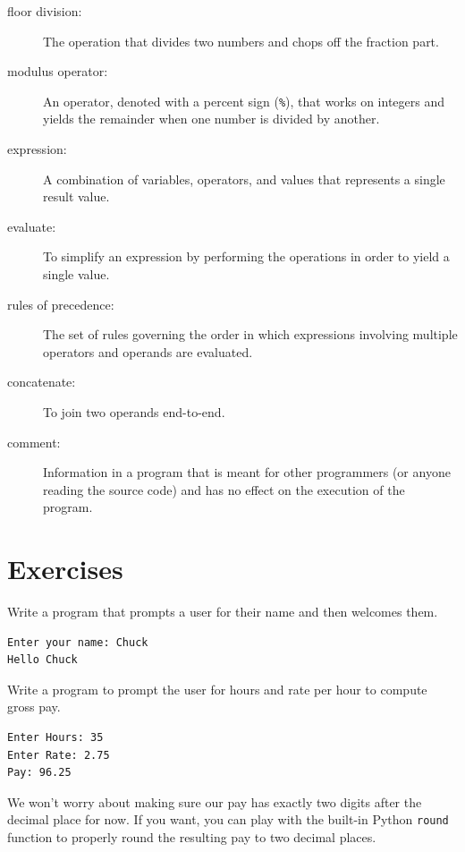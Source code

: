 \documentclass[10pt]{book}
\begin{document}
\begin{description}
\item[floor division:] The operation that divides two numbers and chops off
the fraction part.

\item[modulus operator:]  An operator, denoted with a percent sign
({\tt \%}), that works on integers and yields the remainder when one
number is divided by another.

\item[expression:]  A combination of variables, operators, and values that
represents a single result value.

\item[evaluate:]  To simplify an expression by performing the operations
in order to yield a single value.

\item[rules of precedence:]  The set of rules governing the order in which
expressions involving multiple operators and operands are evaluated.

\item[concatenate:]  To join two operands end-to-end.

\item[comment:]  Information in a program that is meant for other
programmers (or anyone reading the source code) and has no effect on the
execution of the program.

\end{description}

\section{Exercises}

\begin{ex}
Write a program that prompts a user for their name and then 
welcomes them.

\begin{verbatim}
Enter your name: Chuck
Hello Chuck
\end{verbatim}

\end{ex}

\begin{ex}
Write a program to prompt the user for hours and rate per hour to compute
gross pay.
\begin{verbatim}
Enter Hours: 35
Enter Rate: 2.75
Pay: 96.25
\end{verbatim}
\end{ex}
%
We won't worry about making sure our pay has exactly two digits after
the decimal place for now.  If you want, you can play with the 
built-in Python {\tt round} function to properly round the resulting pay
to two decimal places.
\end{document}
